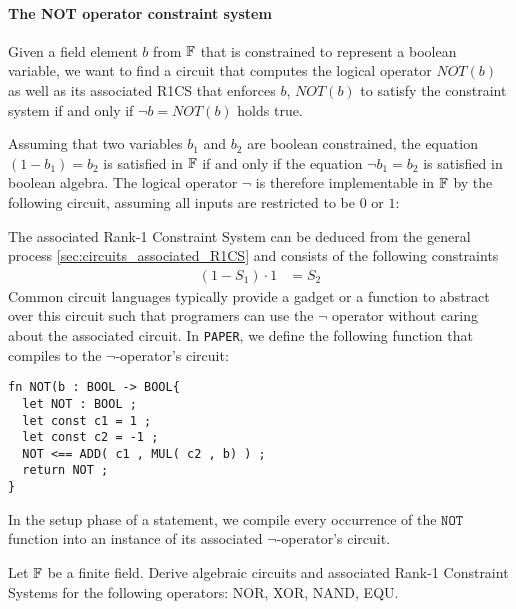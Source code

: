 \paragraph{The NOT operator constraint system} Given a field element $b$ from $\mathbb{F}$ that is constrained to represent a boolean variable, we want to find a circuit that computes the logical  operator $NOT(b)$ as well as its associated R1CS that enforces $b$, $NOT(b)$ to satisfy the constraint system if and only if $\lnot b = NOT(b)$ holds true. 

Assuming that two variables $b_1$ and $b_2$ are boolean constrained, the equation $(1-b_1) = b_2$ is satisfied in $\mathbb{F}$ if and only if the equation $\lnot b_1 = b_2$ is satisfied in boolean algebra. The logical operator $\lnot$ is therefore implementable in $\mathbb{F}$ by the following circuit, assuming all inputs are restricted to be $0$ or $1$:
\begin{center}
\end{center}
The associated Rank-1 Constraint System can be deduced from the general process \ref{sec:circuits_associated_R1CS} and consists of the following constraints
\begin{align*}
  (1-S_1)\cdot 1 &= S_2
\end{align*}
Common circuit languages typically provide a gadget or a function to abstract over this circuit such that programers can use the $\lnot$ operator without caring about the associated circuit. In \texttt{PAPER}, we define the following function that compiles to the $\lnot$-operator's circuit:
\begin{lstlisting}
fn NOT(b : BOOL -> BOOL{
  let NOT : BOOL ;
  let const c1 = 1 ;
  let const c2 = -1 ;
  NOT <== ADD( c1 , MUL( c2 , b) ) ;
  return NOT ;
}
\end{lstlisting}
In the setup phase of a statement, we compile every occurrence of the $\mathtt{NOT}$ function into an instance of its associated $\lnot$-operator's circuit.
\begin{exercise}
Let $\mathbb{F}$ be a finite field. Derive algebraic circuits and associated Rank-1 Constraint Systems for the following operators: NOR, XOR, NAND, EQU.
\end{exercise}
